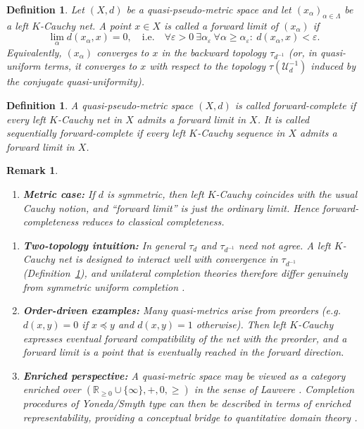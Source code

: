 \documentclass[preprint,12pt]{elsarticle}
\newtheorem{definition}[theorem]{Definition}
\newtheorem{remark}[theorem]{Remark}
\begin{document}
\begin{definition}
\label{def:forwardlimit}
Let $(X,d)$ be a quasi-pseudo-metric space and let
$(x_\alpha)_{\alpha\in\Lambda}$ be a left $K$-Cauchy net. A point $x\in
X$ is called a \emph{forward limit} of $(x_\alpha)$ if
\[
\lim_{\alpha} d(x_\alpha,x)=0,
\quad\text{i.e.}\quad
\forall \varepsilon>0\ \exists \alpha_\varepsilon\ \forall
\alpha\ge\alpha_\varepsilon:\ d(x_\alpha,x)<\varepsilon.
\]
Equivalently, $(x_\alpha)$ converges to $x$ in the backward topology
$\tau_{d^{-1}}$ (or, in quasi-uniform terms, it converges to $x$ with
respect to the topology $\tau(\mathcal{U}_d^{-1})$ induced by the
conjugate quasi-uniformity).
\end{definition}

\begin{definition}
\label{def:forwardcomplete}
A quasi-pseudo-metric space $(X,d)$ is called \emph{forward-complete} if
every left $K$-Cauchy net in $X$ admits a forward limit in $X$. It is
called \emph{sequentially forward-complete} if every left $K$-Cauchy
sequence in $X$ admits a forward limit in $X$.
\end{definition}



\begin{remark}\label{rem:qm-special}

\begin{enumerate}[label=\textup{(\roman*)},itemsep=2pt]
\item \textbf{Metric case:} If $d$ is symmetric, then left $K$-Cauchy
coincides with the usual Cauchy notion, and “forward limit” is just the
ordinary limit. Hence forward-completeness reduces to classical
completeness.
\end{enumerate}

\begin{enumerate}[label=\textup{(\roman*)},itemsep=2pt]
\item \textbf{Two-topology intuition:} In general $\tau_d$ and
$\tau_{d^{-1}}$ need not agree. A left $K$-Cauchy net is designed to
interact well with convergence in $\tau_{d^{-1}}$
(Definition~\ref{def:forwardlimit}), and unilateral completion theories
therefore differ genuinely from symmetric uniform completion
\cite{Kunzi2001}.

\item \textbf{Order-driven examples:} Many quasi-metrics arise from
preorders (e.g.\ $d(x,y)=0$ if $x\preceq y$ and $d(x,y)=1$ otherwise).
Then left $K$-Cauchy expresses eventual forward compatibility of the net
with the preorder, and a forward limit is a point that is eventually
\emph{reached} in the forward direction.

\item \textbf{Enriched perspective:} A quasi-metric space may be viewed as
a category enriched over $(\mathbb{R}_{\ge 0}\cup\{\infty\},+,0,\ge)$ in
the sense of Lawvere \cite{Lawvere1973}. Completion procedures of
Yoneda/Smyth type can then be described in terms of enriched
representability, providing a conceptual bridge to quantitative domain
theory \cite{Kelly1982,KunziSchellekens2002}.
\end{enumerate}
\end{remark}
\end{document}
